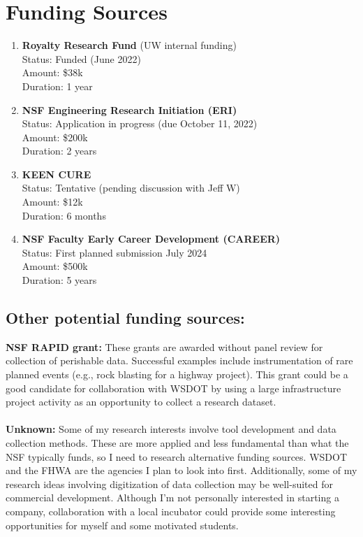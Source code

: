 \documentclass[10pt,letterpaper]{article}
\begin{document}
\section{Funding Sources}
\begin{enumerate}
\item \textbf{Royalty Research Fund} (UW internal funding)\\ 
Status: Funded (June 2022)\\
Amount: \$38k\\
Duration: 1 year
\item \textbf{NSF Engineering Research Initiation (ERI)}\\
Status: Application in progress (due October 11, 2022)\\
Amount: \$200k\\
Duration: 2 years
\item \textbf{KEEN CURE}\\
Status: Tentative (pending discussion with Jeff W)\\
Amount: \$12k\\
Duration: 6 months
\item \textbf{NSF Faculty Early Career Development (CAREER)}\\
Status: First planned submission July 2024\\
Amount: \$500k\\
Duration: 5 years

\end{enumerate}
\subsection*{Other potential funding sources:}

\textbf{NSF RAPID grant:} These grants are awarded without panel review for collection of perishable data. Successful examples include instrumentation of rare planned events (e.g., rock blasting for a highway project). 
This grant could be a good candidate for collaboration with WSDOT by using a large infrastructure project activity as an opportunity to collect a research dataset.
\\
\\
\noindent \textbf{Unknown:} Some of my research interests involve tool development and data collection methods.
These are more applied and less fundamental than what the NSF typically funds, so I need to research alternative funding sources. 
WSDOT and the FHWA are the agencies I plan to look into first.
Additionally, some of my research ideas involving digitization of data collection may be well-suited for commercial development. 
Although I'm not personally interested in starting a company, collaboration with a local incubator could provide some interesting opportunities for myself and some motivated students.
\end{document}
